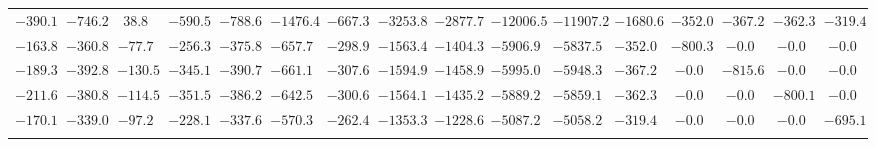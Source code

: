\begin{tabular}{cccccccccccccccc}
$-390.1$ & $-746.2$ & $38.8$ & $-590.5$ & $-788.6$ & $-1476.4$ & $-667.3$ & $-3253.8$ & $-2877.7$ & $-12006.5$ & $-11907.2$ & $-1680.6$ & $-352.0$ & $-367.2$ & $-362.3$ & $-319.4$\\
$-163.8$ & $-360.8$ & $-77.7$ & $-256.3$ & $-375.8$ & $-657.7$ & $-298.9$ & $-1563.4$ & $-1404.3$ & $-5906.9$ & $-5837.5$ & $-352.0$ & $-800.3$ & $-0.0$ & $-0.0$ & $-0.0$\\
$-189.3$ & $-392.8$ & $-130.5$ & $-345.1$ & $-390.7$ & $-661.1$ & $-307.6$ & $-1594.9$ & $-1458.9$ & $-5995.0$ & $-5948.3$ & $-367.2$ & $-0.0$ & $-815.6$ & $-0.0$ & $-0.0$\\
$-211.6$ & $-380.8$ & $-114.5$ & $-351.5$ & $-386.2$ & $-642.5$ & $-300.6$ & $-1564.1$ & $-1435.2$ & $-5889.2$ & $-5859.1$ & $-362.3$ & $-0.0$ & $-0.0$ & $-800.1$ & $-0.0$\\
$-170.1$ & $-339.0$ & $-97.2$ & $-228.1$ & $-337.6$ & $-570.3$ & $-262.4$ & $-1353.3$ & $-1228.6$ & $-5087.2$ & $-5058.2$ & $-319.4$ & $-0.0$ & $-0.0$ & $-0.0$ & $-695.1$\\
\par \toprule
\end{tabular}
